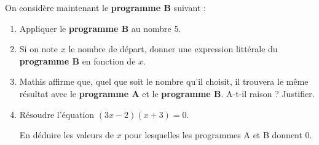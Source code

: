 \documentclass[exercice]{thedocument}%
\begin{document}
    On considère maintenant le \textbf{programme B} suivant :

    \begin{center}
    \end{center}

    \begin{enumerate}[resume]
        \item Appliquer le \textbf{programme B} au nombre 5.

        \item Si on note $x$ le nombre de départ, donner une expression littérale du \textbf{programme B} en fonction de $x$.

        \item Mathis affirme que, quel que soit le nombre qu'il choisit, il trouvera le même résultat avec le \textbf{programme A} et le \textbf{programme B}. A-t-il raison ? Justifier.

        \item Résoudre l'équation $(3x-2)(x+3) = 0$.

        En déduire les valeurs de $x$ pour lesquelles les programmes A et B donnent 0.
    \end{enumerate}
    \showthesource
\end{document}
